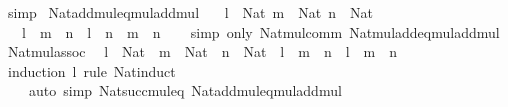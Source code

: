 \begin{isabellebody}
\ simp%
\endisatagproof
{\isafoldproof}%
%
\isadelimproof
\isanewline
%
\endisadelimproof
\isanewline
{}\isamarkupfalse%
\ Nat{\isacharunderscore}{\kern0pt}add{\isacharunderscore}{\kern0pt}mul{\isacharunderscore}{\kern0pt}eq{\isacharunderscore}{\kern0pt}mul{\isacharunderscore}{\kern0pt}add{\isacharunderscore}{\kern0pt}mul{\isacharcolon}{\kern0pt}\isanewline
\ \ \ {\isachardoublequoteopen}l\ {\isacharcolon}{\kern0pt}\ Nat{\isachardoublequoteclose}\ {\isachardoublequoteopen}m\ {\isacharcolon}{\kern0pt}\ Nat{\isachardoublequoteclose}\ {\isachardoublequoteopen}n\ {\isacharcolon}{\kern0pt}\ Nat{\isachardoublequoteclose}\isanewline
\ \ \ {\isachardoublequoteopen}{\isacharparenleft}{\kern0pt}l\ {\isacharplus}{\kern0pt}\ m{\isacharparenright}{\kern0pt}\ {\isacharasterisk}{\kern0pt}\ n\ {\isacharequal}{\kern0pt}\ l\ {\isacharasterisk}{\kern0pt}\ n\ {\isacharplus}{\kern0pt}\ m\ {\isacharasterisk}{\kern0pt}\ n{\isachardoublequoteclose}\isanewline
%
\isadelimproof
\ \ %
\endisadelimproof
%
\isatagproof
{}\isamarkupfalse%
\ {\isacharparenleft}{\kern0pt}simp\ only{\isacharcolon}{\kern0pt}\ Nat{\isacharunderscore}{\kern0pt}mul{\isacharunderscore}{\kern0pt}comm\ Nat{\isacharunderscore}{\kern0pt}mul{\isacharunderscore}{\kern0pt}add{\isacharunderscore}{\kern0pt}eq{\isacharunderscore}{\kern0pt}mul{\isacharunderscore}{\kern0pt}add{\isacharunderscore}{\kern0pt}mul{\isacharparenright}{\kern0pt}%
\endisatagproof
{\isafoldproof}%
%
\isadelimproof
\isanewline
%
\endisadelimproof
\isanewline
{}\isamarkupfalse%
\ Nat{\isacharunderscore}{\kern0pt}mul{\isacharunderscore}{\kern0pt}assoc{\isacharcolon}{\kern0pt}\isanewline
\ \ {\isachardoublequoteopen}l\ {\isacharcolon}{\kern0pt}\ Nat\ {\isasymLongrightarrow}\ m\ {\isacharcolon}{\kern0pt}\ Nat\ {\isasymLongrightarrow}\ n\ {\isacharcolon}{\kern0pt}\ Nat\ {\isasymLongrightarrow}\ l\ {\isacharasterisk}{\kern0pt}\ m\ {\isacharasterisk}{\kern0pt}\ n\ {\isacharequal}{\kern0pt}\ l\ {\isacharasterisk}{\kern0pt}\ {\isacharparenleft}{\kern0pt}m\ {\isacharasterisk}{\kern0pt}\ n{\isacharparenright}{\kern0pt}{\isachardoublequoteclose}\isanewline
%
\isadelimproof
\ \ %
\endisadelimproof
%
\isatagproof
{}\isamarkupfalse%
\ {\isacharparenleft}{\kern0pt}induction\ l\ rule{\isacharcolon}{\kern0pt}\ Nat{\isacharunderscore}{\kern0pt}induct{\isacharparenright}{\kern0pt}\isanewline
\ \ \ \ {\isacharparenleft}{\kern0pt}auto\ simp{\isacharcolon}{\kern0pt}\ Nat{\isacharunderscore}{\kern0pt}succ{\isacharunderscore}{\kern0pt}mul{\isacharunderscore}{\kern0pt}eq\ Nat{\isacharunderscore}{\kern0pt}add{\isacharunderscore}{\kern0pt}mul{\isacharunderscore}{\kern0pt}eq{\isacharunderscore}{\kern0pt}mul{\isacharunderscore}{\kern0pt}add{\isacharunderscore}{\kern0pt}mul{\isacharparenright}{\kern0pt}%

\end{isabellebody}

